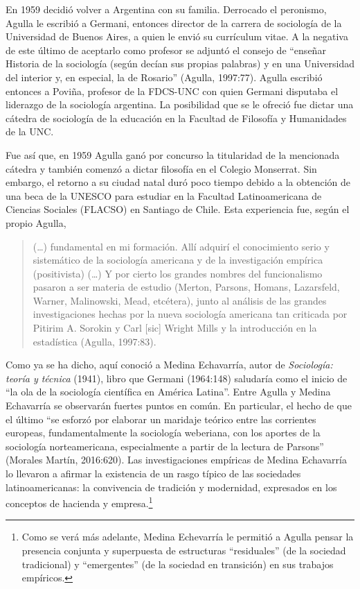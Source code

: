 En 1959 decidió volver a Argentina con su familia. Derrocado el peronismo, Agulla le escribió a Germani, entonces director de la carrera de sociología de la Universidad de Buenos Aires, a quien le envió su currículum vitae. A la negativa de este último de aceptarlo como profesor se adjuntó el consejo de \enquote{enseñar Historia de la sociología (según decían sus propias palabras) y en una Universidad del interior y, en especial, la de Rosario} (Agulla, 1997:77). Agulla escribió entonces a Poviña, profesor de la FDCS-UNC con quien Germani disputaba el liderazgo de la sociología argentina. La posibilidad que se le ofreció fue dictar una cátedra de sociología de la educación en la Facultad de Filosofía y Humanidades de la UNC.

Fue así que, en 1959 Agulla ganó por concurso la titularidad de la mencionada cátedra y también comenzó a dictar filosofía en el Colegio Monserrat. Sin embargo, el retorno a su ciudad natal duró poco tiempo debido a la obtención de una beca de la UNESCO para estudiar en la Facultad Latinoamericana de Ciencias Sociales (FLACSO) en Santiago de Chile. Esta experiencia fue, según el propio Agulla,

\begin{quote}
(\dots) fundamental en mi formación. Allí adquirí el conocimiento serio y sistemático de la sociología americana y de la investigación empírica (positivista) (\dots) Y por cierto los grandes nombres del funcionalismo pasaron a ser materia de estudio (Merton, Parsons, Homans, Lazarsfeld, Warner, Malinowski, Mead, etcétera), junto al análisis de las grandes investigaciones hechas por la nueva sociología americana tan criticada por Pitirim A. Sorokin y Carl [sic] Wright Mills y la introducción en la estadística (Agulla, 1997:83).
\end{quote}

Como ya se ha dicho, aquí conoció a Medina Echavarría, autor de \emph{Sociología: teoría y técnica} (1941), libro que Germani (1964:148) saludaría como el inicio de \enquote{la ola de la sociología científica en América Latina}. Entre Agulla y Medina Echavarría se observarán fuertes puntos en común. En particular, el hecho de que el último \enquote{se esforzó por elaborar un maridaje teórico entre las corrientes europeas, fundamentalmente la sociología weberiana, con los aportes de la sociología norteamericana, especialmente a partir de la lectura de Parsons} (Morales Martín, 2016:620). Las investigaciones empíricas de Medina Echavarría lo llevaron a afirmar la existencia de un rasgo típico de las sociedades latinoamericanas: la convivencia de tradición y modernidad, expresados en los conceptos de hacienda y empresa.\footnote{Como se verá más adelante, Medina Echevarría le permitió a Agulla pensar la presencia conjunta y superpuesta de estructuras \enquote{residuales} (de la sociedad tradicional) y \enquote{emergentes} (de la sociedad en transición) en sus trabajos empíricos.}


